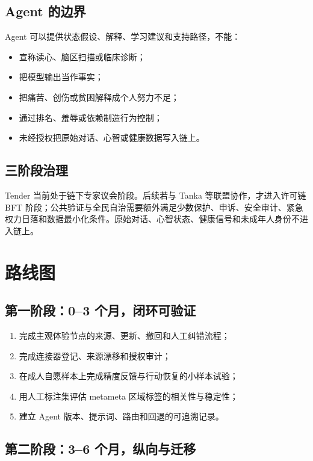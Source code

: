 \documentclass[UTF8,a4paper,11pt]{ctexart}
\begin{document}
\subsection{Agent 的边界}

Agent 可以提供状态假设、解释、学习建议和支持路径，不能：

\begin{itemize}
\item 宣称读心、脑区扫描或临床诊断；
\item 把模型输出当作事实；
\item 把痛苦、创伤或贫困解释成个人努力不足；
\item 通过排名、羞辱或依赖制造行为控制；
\item 未经授权把原始对话、心智或健康数据写入链上。
\end{itemize}

\subsection{三阶段治理}

Tender 当前处于链下专家议会阶段。后续若与 Tanka 等联盟协作，才进入许可链 BFT 阶段；公共验证与全民自治需要额外满足少数保护、申诉、安全审计、紧急权力日落和数据最小化条件。原始对话、心智状态、健康信号和未成年人身份不进入链上。

\newpage
\section{路线图}

\subsection{第一阶段：0--3 个月，闭环可验证}

\begin{enumerate}
\item 完成主观体验节点的来源、更新、撤回和人工纠错流程；
\item 完成连接器登记、来源漂移和授权审计；
\item 在成人自愿样本上完成精度反馈与行动恢复的小样本试验；
\item 用人工标注集评估 metameta 区域标签的相关性与稳定性；
\item 建立 Agent 版本、提示词、路由和回退的可追溯记录。
\end{enumerate}

\subsection{第二阶段：3--6 个月，纵向与迁移}
\end{document}
